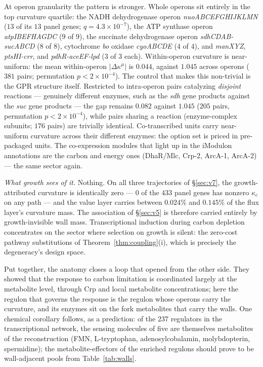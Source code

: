 \documentclass[11pt,a4paper]{article}
\theoremstyle{plain}
\theoremstyle{definition}
\theoremstyle{remark}
\newcommand{\kmu}{\kappa^{\mu}}
\begin{document}
At operon granularity the pattern is stronger. Whole operons sit
entirely in the top curvature quartile: the NADH dehydrogenase
operon \emph{nuoABCEFGHIJKLMN} ($13$ of its $13$ panel genes; $q =
4.3 \times 10^{-7}$), the ATP synthase operon \emph{atpIBEFHAGDC}
($9$ of $9$), the succinate dehydrogenase operon
\emph{sdhCDAB-sucABCD} ($8$ of $8$), cytochrome \emph{bo}
oxidase \emph{cyoABCDE} ($4$ of $4$), and \emph{manXYZ},
\emph{ptsHI-crr}, and \emph{pdhR-aceEF-lpd} ($3$ of $3$ each).
Within-operon curvature is near-uniform: the mean
within-operon $|\Delta\kmu|$ is $0.044$, against $1.045$ across
operons ($381$ pairs; permutation $p < 2 \times 10^{-4}$). The
control that makes this non-trivial is the GPR structure itself.
Restricted to intra-operon pairs catalyzing \emph{disjoint}
reactions --- genuinely different enzymes, such as the
\emph{sdh} gene products against the \emph{suc} gene products ---
the gap remains $0.082$ against $1.045$ ($205$ pairs,
permutation $p < 2 \times 10^{-4}$), while pairs sharing a
reaction (enzyme-complex subunits; $176$ pairs) are trivially
identical. Co-transcribed units carry near-uniform curvature
across their different enzymes: the option set is priced in
pre-packaged units. The co-expression modules that light up in the
iModulon annotations are the carbon and energy ones (DhaR/Mlc,
Crp-2, ArcA-1, ArcA-2) --- the same sector again.

\emph{What growth sees of it.} Nothing. On all three trajectories
of \S\ref{sec:v7}, the growth-attributed curvature is identically
zero --- $0$ of the $433$ panel genes has nonzero $\kappa_c$ on
any path --- and the value layer carries between $0.024\%$ and
$0.145\%$ of the flux layer's curvature mass. The association of
\S\ref{sec:v5} is therefore carried entirely by growth-invisible
wall mass. Transcriptional induction during carbon depletion
concentrates on the sector where selection on growth is silent:
the zero-cost pathway substitutions of Theorem~\ref{thm:coupling}(i),
which is precisely the degeneracy's design space.

Put together, the anatomy closes a loop that
\citet{kochanowski2013} opened from the other side. They showed
that the response to carbon limitation is coordinated largely at
the metabolite level, through Crp and local metabolite
concentrations; here the regulon that governs the response is the
regulon whose operons carry the curvature, and its enzymes sit on
the fork metabolites that carry the walls. One chemical corollary
follows, as a prediction: of the $237$ regulators in the
transcriptional network, the sensing molecules of five are
themselves metabolites of the reconstruction (FMN, L-tryptophan,
adenosylcobalamin, molybdopterin, spermidine); the
metabolite-effectors of the enriched regulons should prove to be
wall-adjacent pools from Table~\ref{tab:walls}.
\end{document}
